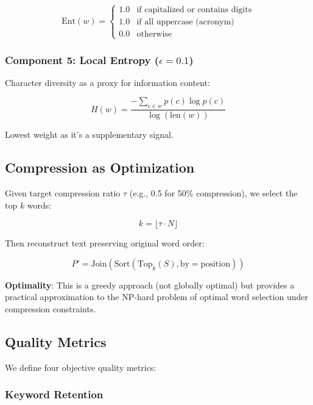 \begin{equation}
\text{Ent}(w) = \begin{cases}
1.0 & \text{if capitalized or contains digits} \\
1.0 & \text{if all uppercase (acronym)} \\
0.0 & \text{otherwise}
\end{cases}
\end{equation}

\subsubsection{Component 5: Local Entropy ($\epsilon = 0.1$)}

Character diversity as a proxy for information content:

\begin{equation}
H(w) = \frac{-\sum_{c \in w} p(c) \log p(c)}{\log(\text{len}(w))}
\end{equation}

Lowest weight as it's a supplementary signal.

\subsection{Compression as Optimization}

Given target compression ratio $\tau$ (e.g., 0.5 for 50\% compression), we select the top $k$ words:

\begin{equation}
k = \lfloor \tau \cdot N \rfloor
\end{equation}

Then reconstruct text preserving original word order:

\begin{equation}
P' = \text{Join}(\text{Sort}(\text{Top}_k(S), \text{by}=\text{position}))
\end{equation}

\textbf{Optimality}: This is a greedy approach (not globally optimal) but provides a practical approximation to the NP-hard problem of optimal word selection under compression constraints.

\subsection{Quality Metrics}

We define four objective quality metrics:

\subsubsection{Keyword Retention}

